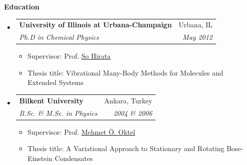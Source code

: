 \documentclass[letterpaper,11pt]{article}
\makeatletter
\newcommand{\resitem}[1]{\item #1 \vspace{-2pt}}
\newcommand{\resheading}[1]{{\large \colorbox{mygrey}{\begin{minipage}{\textwidth}{\textbf{#1 \vphantom{p\^{E}}}}\end{minipage}}}}
\newcommand{\ressubheading}[4]{
\begin{tabular*}{7.0in}{l@{\extracolsep{\fill}}r}
        \textbf{#1} & #2 \\
        \textit{#3} & \textit{#4} \\
\end{tabular*}\vspace{-5pt}}
\makeatother
\begin{document}
\resheading{Education}
\begin{itemize}

\item
    \ressubheading{University of Illinois at Urbana-Champaign}{Urbana, IL}{Ph.D 
    in Chemical Physics} {May 2012}
    \begin{itemize}
      \resitem {Supervisor: Prof. \href{http://www.scs.illinois.edu/~sohirata/}{So Hirata}}
      \resitem{Thesis title: Vibrational Many-Body Methods for Molecules and Extended Systems } 
    \end{itemize}
\item
   \ressubheading{Bilkent University}{Ankara, Turkey}{B.Sc. \& M.Sc. in Physics}{2004 \& 2006}
    \begin{itemize}
       \resitem {Supervisor: Prof. \href{http://www.fen.bilkent.edu.tr/~oktel/} {Mehmet \"{O}. Oktel}}
        \resitem{Thesis title: A Variational Approach to Stationary and Rotating
        Bose-Einstein Condensates} 
    \end{itemize} 
\end{itemize}
%



\pagebreak










%




%



%
%

 

%	

	
%
\end{document}
